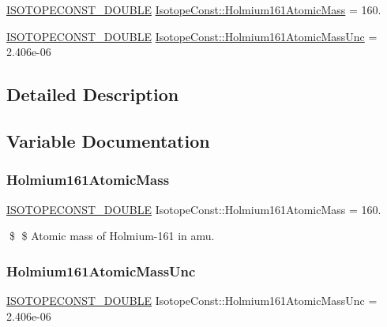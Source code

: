 \begin{DoxyCompactItemize}
\item 
\mbox{\hyperlink{group___isotope_const-_macros_ga8f45a7272ce02c0b4c65c44636ed719a}{I\+S\+O\+T\+O\+P\+E\+C\+O\+N\+S\+T\+\_\+\+D\+O\+U\+B\+LE}} \mbox{\hyperlink{group___isotope_const-_holmium-_ho161_ga21b734e449c80374d4fa0e5c73bc76a9}{Isotope\+Const\+::\+Holmium161\+Atomic\+Mass}} = 160.
\item 
\mbox{\hyperlink{group___isotope_const-_macros_ga8f45a7272ce02c0b4c65c44636ed719a}{I\+S\+O\+T\+O\+P\+E\+C\+O\+N\+S\+T\+\_\+\+D\+O\+U\+B\+LE}} \mbox{\hyperlink{group___isotope_const-_holmium-_ho161_ga6dea9f398b4c771ddbdfc5afa24f86d8}{Isotope\+Const\+::\+Holmium161\+Atomic\+Mass\+Unc}} = 2.\+406e-\/06
\end{DoxyCompactItemize}


\subsection{Detailed Description}


\subsection{Variable Documentation}
\mbox{\label{group___isotope_const-_holmium-_ho161_ga21b734e449c80374d4fa0e5c73bc76a9}} 
\subsubsection{\texorpdfstring{Holmium161\+Atomic\+Mass}{Holmium161AtomicMass}}
{\footnotesize\ttfamily \mbox{\hyperlink{group___isotope_const-_macros_ga8f45a7272ce02c0b4c65c44636ed719a}{I\+S\+O\+T\+O\+P\+E\+C\+O\+N\+S\+T\+\_\+\+D\+O\+U\+B\+LE}} Isotope\+Const\+::\+Holmium161\+Atomic\+Mass = 160.}

\$ \$ Atomic mass of Holmium-\/161 in amu. \mbox{\label{group___isotope_const-_holmium-_ho161_ga6dea9f398b4c771ddbdfc5afa24f86d8}} 
\subsubsection{\texorpdfstring{Holmium161\+Atomic\+Mass\+Unc}{Holmium161AtomicMassUnc}}
{\footnotesize\ttfamily \mbox{\hyperlink{group___isotope_const-_macros_ga8f45a7272ce02c0b4c65c44636ed719a}{I\+S\+O\+T\+O\+P\+E\+C\+O\+N\+S\+T\+\_\+\+D\+O\+U\+B\+LE}} Isotope\+Const\+::\+Holmium161\+Atomic\+Mass\+Unc = 2.\+406e-\/06}

